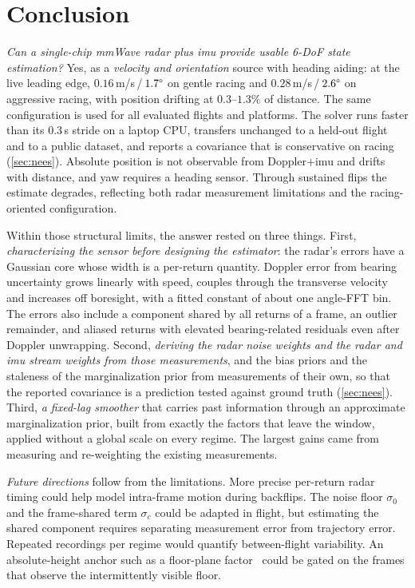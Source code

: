 \section{Conclusion}
\label{sec:conclusion}

\emph{Can a single-chip mmWave radar plus \ac{imu} provide usable 6-DoF
state estimation?}  Yes, as a \emph{velocity and orientation}
source with heading aiding: at the live leading edge,
$0.16$\,m/s\,/\,$1.7\degree$ on gentle racing
and $0.28$\,m/s\,/\,$2.6\degree$ on aggressive
racing, with position drifting at $0.3$--$1.3\%$ of distance.
The same configuration is used for all evaluated flights and platforms.
The solver runs faster than its 0.3\,s stride on a laptop CPU,
transfers unchanged to a held-out
flight and to a public dataset, and reports a covariance that is
conservative on racing (\autoref{sec:nees}).  Absolute
position is not observable from Doppler+\ac{imu} and drifts with
distance, and yaw requires a heading sensor.  Through sustained flips
the estimate degrades, reflecting both radar measurement limitations
and the racing-oriented configuration.

Within those structural limits, the answer rested on three things.
First, \emph{characterizing the sensor before designing the
estimator}: the radar's errors have a Gaussian core whose width is a
per-return quantity.  Doppler error from bearing uncertainty grows
linearly with speed, couples through the transverse velocity and
increases off boresight, with a fitted constant of about one
angle-FFT bin.  The errors also
include a component shared by all returns of a frame, an outlier
remainder, and aliased returns with elevated bearing-related residuals
even after Doppler unwrapping.
Second, \emph{deriving
the radar noise weights and the radar and \ac{imu} stream weights
from those measurements}, and
the bias priors and the staleness of the marginalization prior from
measurements of their own, so that the reported covariance is a prediction tested against ground truth (\autoref{sec:nees}).  Third, \emph{a fixed-lag smoother} that
carries past information through an approximate marginalization prior, built from exactly the factors that leave the window,
applied
without a global scale on every regime.  The largest gains
came from measuring and re-weighting the existing measurements.

\emph{Future directions} follow from the limitations.  More precise
per-return radar timing could help model intra-frame motion during
backflips.  The noise floor $\sigma_0$ and the frame-shared term $\sigma_c$
could be adapted in flight, but estimating the shared component
requires separating measurement error from trajectory error.  Repeated recordings per
regime would quantify between-flight variability.  An absolute-height anchor
such as a floor-plane factor~\cite{yang2025gorio} could be gated on the
frames that observe the intermittently visible floor.
